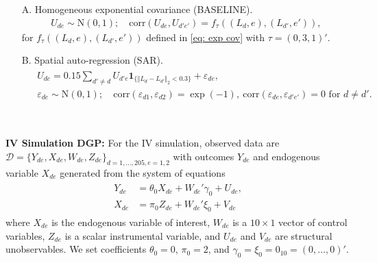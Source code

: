\documentclass[preprint]{imsart}
\numberwithin{equation}{section}
\theoremstyle{plain}
\theoremstyle{definition}
\renewcommand{\(}{\left(}
\renewcommand{\)}{\right)}
\renewcommand{\[}{\left[}
\renewcommand{\]}{\right]}
\begin{document}
\begin{itemize}
	\item[ A.] Homogeneous exponential covariance ({BASELINE}).  
	\begin{align}
		U_{de}\sim \mathrm N(0,1); \quad \mathrm{corr}(U_{de},U_{d'e'})=f_{\tau}( (L_d,e),(L_{d'},e')),
	\end{align}
	 for $f_{\tau}( (L_d,e),(L_{d'},e'))$ defined in \eqref{eq: exp cov} with $\tau = (0,3,1)'$.
	\item[B.] Spatial auto-regression ({SAR}).
\begin{align}\begin{split}
	& U_{de}=0.15 \textstyle \sum_{d'\ne d}U_{d'e} \textbf{1}_{\{ \Vert L_d-L_{d'}\Vert_2<0.3 \}}  +\varepsilon_{de}, \\
	& \varepsilon_{de}\sim \mathrm N(0,1); \quad  \mathrm{corr}(\varepsilon_{d1},\varepsilon_{d2})=\exp(-1),\  \mathrm{corr}(\varepsilon_{de},\varepsilon_{d'e'})=0\text{ for }d\ne d'.
\end{split}\end{align}

\end{itemize}




\

\noindent
\textbf{IV Simulation DGP:} For the IV simulation, observed data are $\mathscr D= \{ Y_{de}, X_{de}, W_{de},Z_{de} \}_{d=1,...,205, e=1,2}$ with outcomes $Y_{de}$ and endogenous variable $X_{de}$ generated from the system of equations 
\begin{align}\label{eq: IV sim}
	\begin{split} 
	Y_{de}&=\theta_0 X_{de}+W_{de}'\gamma_0+U_{de},\\
	X_{de}&=\pi_0 Z_{de}+W_{de}'\xi_0+V_{de}
	\end{split} 
\end{align}
where $X_{de}$ is the endogenous variable of interest, $W_{de}$ is a $10 \times 1$ vector of control variables, $Z_{de}$ is a scalar instrumental variable, and $U_{de}$ and $V_{de}$ are structural unobservables. We set coefficients $\theta_0=0$, $\pi_0=2$, and $\gamma_0=\xi_0=0_{10}=(0,\dots,0)'$.
\end{document}
